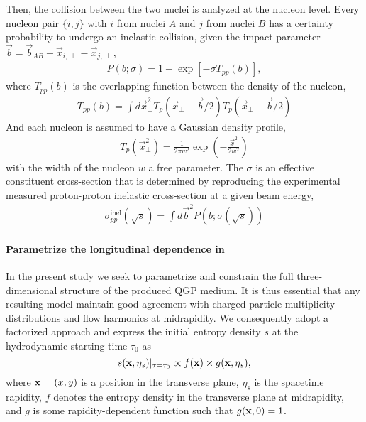 Then, the collision between the two nuclei is analyzed at the nucleon level. 
Every nucleon pair $\{i, j\}$ with $i$ from nuclei $A$ and $j$ from nuclei $B$ has a certainty probability to undergo an inelastic collision, given the impact parameter $\vec{b} = \vec{b}_{AB} + \vec{x}_{i, \perp} -  \vec{x}_{j, \perp}$,
\begin{eqnarray}
P(b; \sigma) = 1 - \exp\left[-\sigma T_{pp}(b)\right],
\label{dsigma_db}
\end{eqnarray}
where $T_{pp}(b)$ is the overlapping function between the density of the nucleon,
\begin{eqnarray}
T_{pp}(b) = \int d\vec{x}_\perp^2 T_p(\vec{x}_\perp-\vec{b}/2) T_p(\vec{x}_\perp+\vec{b}/2)
\end{eqnarray}
And each nucleon is assumed to have a Gaussian density profile, 
\begin{eqnarray}
T_p(\vec{x}_\perp^2) = \frac{1}{2\pi w^2} \exp\left(-\frac{\vec{x}^2}{2w^2}\right)
\end{eqnarray}
with the width of the nucleon $w$ a free parameter.
The $\sigma$ is an effective constituent cross-section that is determined by reproducing the experimental measured proton-proton inelastic cross-section at a given beam energy,
\begin{eqnarray}
\sigma_{pp}^\text{inel}(\sqrt{s}) = \int d\vec{b}^2 P(b; \sigma(\sqrt{s}))
\end{eqnarray}


\paragraph{Parametrize the longitudinal dependence in \trento}



In the present study we seek to parametrize and constrain the full three-dimensional structure of the produced QGP medium.
It is thus essential that any resulting model maintain good agreement with charged particle multiplicity distributions and flow harmonics at midrapidity.
We consequently adopt a factorized approach and express the initial entropy density $s$ at the hydrodynamic starting time $\tau_0$ as
\begin{equation}
  s(\mathbf x, \eta_s)\vert_{\tau=\tau_0} \propto f(\mathbf x) \times g(\mathbf x, \eta_s),
  \label{factorized}
\end{equation}
where $\mathbf x = (x, y)$ is a position in the transverse plane, $\eta_s$ is the spacetime rapidity, $f$ denotes the entropy density in the transverse plane at midrapidity, and $g$ is some rapidity-dependent function such that $g(\mathbf x, 0)=1$.

